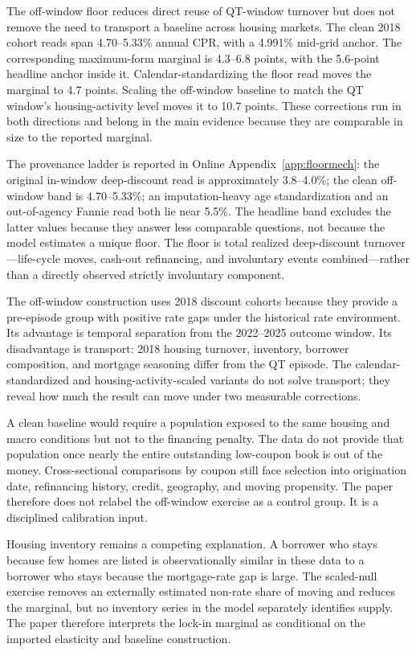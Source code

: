 The off-window floor reduces direct reuse of QT-window turnover but does not remove the need to transport a baseline across housing markets. The clean 2018 cohort reads span 4.70--5.33\% annual CPR, with a 4.991\% mid-grid anchor. The corresponding maximum-form marginal is 4.3--6.8 points, with the 5.6-point headline anchor inside it. Calendar-standardizing the floor read moves the marginal to 4.7 points. Scaling the off-window baseline to match the QT window's housing-activity level moves it to 10.7 points. These corrections run in both directions and belong in the main evidence because they are comparable in size to the reported marginal.

The provenance ladder is reported in Online Appendix~\ref{app:floormech}: the original in-window deep-discount read is approximately 3.8--4.0\%; the clean off-window band is 4.70--5.33\%; an imputation-heavy age standardization and an out-of-agency Fannie read both lie near 5.5\%. The headline band excludes the latter values because they answer less comparable questions, not because the model estimates a unique floor. The floor is total realized deep-discount turnover---life-cycle moves, cash-out refinancing, and involuntary events combined---rather than a directly observed strictly involuntary component.

The off-window construction uses 2018 discount cohorts because they provide a pre-episode group with positive rate gaps under the historical rate environment. Its advantage is temporal separation from the 2022--2025 outcome window. Its disadvantage is transport: 2018 housing turnover, inventory, borrower composition, and mortgage seasoning differ from the QT episode. The calendar-standardized and housing-activity-scaled variants do not solve transport; they reveal how much the result can move under two measurable corrections.

A clean baseline would require a population exposed to the same housing and macro conditions but not to the financing penalty. The data do not provide that population once nearly the entire outstanding low-coupon book is out of the money. Cross-sectional comparisons by coupon still face selection into origination date, refinancing history, credit, geography, and moving propensity. The paper therefore does not relabel the off-window exercise as a control group. It is a disciplined calibration input.

Housing inventory remains a competing explanation. A borrower who stays because few homes are listed is observationally similar in these data to a borrower who stays because the mortgage-rate gap is large. The scaled-null exercise removes an externally estimated non-rate share of moving and reduces the marginal, but no inventory series in the model separately identifies supply. The paper therefore interprets the lock-in marginal as conditional on the imported elasticity and baseline construction.

